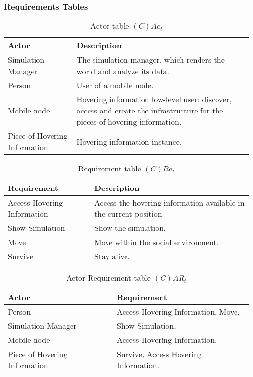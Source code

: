 \subsubsection{Requirements Tables}

\begin{table}[H]
	\centering
	\begin{tabular}{|p{4cm}|p{8cm}|}
			\hline
			\textbf{Actor} & \textbf{Description} \\
			\hline
      Simulation Manager & The simulation manager, which renders the world and
      analyze its data. \\
			\hline
			Person & User of a mobile node. \\
			\hline
			Mobile node & Hovering information low-level user: discover, access and
			create the infrastructure for the pieces of hovering information. \\
			\hline
			Piece of Hovering Information & Hovering information instance. \\
			\hline
		\end{tabular}
	\caption{Actor table $(C)Ac_t$}
	\label{tab:cact}
\end{table}

\begin{table}[H]
	\centering
	\begin{tabular}{|p{4cm}|p{8cm}|}
			\hline
			\textbf{Requirement} & \textbf{Description} \\
			\hline
      Access Hovering Information & Access the hovering information
      available in the current position. \\
			\hline
			Show Simulation & Show the simulation. \\
			\hline
			Move & Move within the social environment. \\
			\hline
			Survive & Stay alive. \\
			\hline
		\end{tabular}
	\caption{Requirement table $(C)Re_t$}
	\label{tab:cact}
\end{table}

\begin{table}[H]
	\centering
	\begin{tabular}{|p{4cm}|p{8cm}|}
			\hline
			\textbf{Actor} & \textbf{Requirement} \\
			\hline
			Person & Access Hovering Information, Move. \\
			\hline
			Simulation Manager & Show Simulation. \\
			\hline
			Mobile node & Access Hovering Information. \\
			\hline
			Piece of Hovering Information & Survive, Access Hovering Information. \\
			\hline
		\end{tabular}
	\caption{Actor-Requirement table $(C)AR_t$}
	\label{tab:cart}
\end{table}

